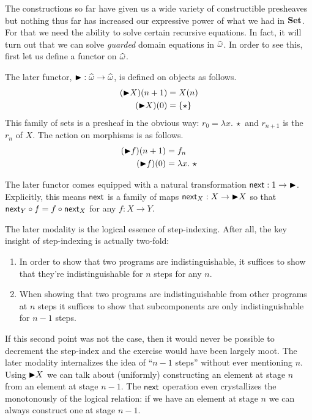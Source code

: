 The constructions so far have given us a wide variety of constructible
presheaves but nothing thus far has increased our expressive power of
what we had in $\mathbf{Set}$. For that we need the ability to solve certain
recursive equations. In fact, it will turn out that we can solve
\emph{guarded} domain equations in $\widehat{\omega}$. In order to
see this, first let us define a functor on $\widehat{\omega}$.
\begin{defn}
  The later functor,
  ${\blacktriangleright} : \widehat{\omega} \to \widehat{\omega}$, is defined
  on objects as follows.
  \begin{align*}
    ({\blacktriangleright} X)(n + 1) &= X(n)\\
    ({\blacktriangleright} X)(0) &= \{\star\}
  \end{align*}
  This family of sets is a presheaf in the obvious way:
  $r_0 = \lambda x.\ \star$ and $r_{n + 1}$ is the $r_n$ of $X$. The
  action on morphisms is as follows.
  \begin{align*}
    ({\blacktriangleright} f)(n + 1) &= f_n\\
    ({\blacktriangleright} f)(0) &= \lambda x.\ \star
  \end{align*}

  The later functor comes equipped with a natural transformation
  $\mathsf{next} : 1 \to {\blacktriangleright}$. Explicitly, this means $\mathsf{next}$ is a family
  of maps $\mathsf{next}_X : X \to {\blacktriangleright} X$ so that
  $\mathsf{next}_Y \circ f = f \circ \mathsf{next}_X$ for any $f : X \to Y$.
\end{defn}
The later modality is the logical essence of step-indexing.
After all, the key insight of step-indexing is actually two-fold:
\begin{enumerate}
\item In order to show that two programs are indistinguishable, it
  suffices to show that they're indistinguishable for $n$ steps for
  any $n$.
\item When showing that two programs are indistinguishable from other
  programs at $n$ steps it suffices to show that subcomponents are
  only indistinguishable for $n - 1$ steps.
\end{enumerate}
If this second point was not the case, then it would never be possible
to decrement the step-index and the exercise would have been largely
moot. The later modality internalizes the idea of ``$n - 1$ steps''
without ever mentioning $n$. Using ${\blacktriangleright} X$ we can talk about
(uniformly) constructing an element at stage $n$ from an element at
stage $n - 1$. The $\mathsf{next}$ operation even crystallizes the
monotonously of the logical relation: if we have an element at stage
$n$ we can always construct one at stage $n - 1$.

